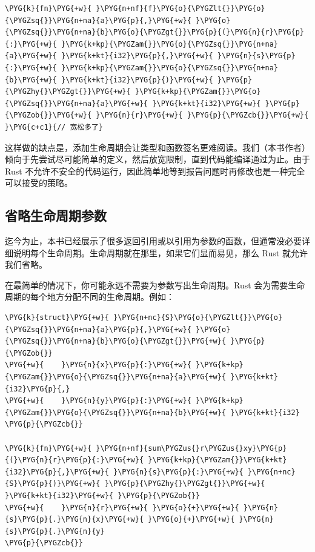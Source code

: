 \begin{Verbatim}[commandchars=\\\{\},breaklines=true,breakanywhere=true,fontsize=\codefont,xleftmargin=17bp]
\PYG{k}{fn}\PYG{+w}{ }\PYG{n+nf}{f}\PYG{o}{\PYGZlt{}}\PYG{o}{\PYGZsq{}}\PYG{n+na}{a}\PYG{p}{,}\PYG{+w}{ }\PYG{o}{\PYGZsq{}}\PYG{n+na}{b}\PYG{o}{\PYGZgt{}}\PYG{p}{(}\PYG{n}{r}\PYG{p}{:}\PYG{+w}{ }\PYG{k+kp}{\PYGZam{}}\PYG{o}{\PYGZsq{}}\PYG{n+na}{a}\PYG{+w}{ }\PYG{k+kt}{i32}\PYG{p}{,}\PYG{+w}{ }\PYG{n}{s}\PYG{p}{:}\PYG{+w}{ }\PYG{k+kp}{\PYGZam{}}\PYG{o}{\PYGZsq{}}\PYG{n+na}{b}\PYG{+w}{ }\PYG{k+kt}{i32}\PYG{p}{)}\PYG{+w}{ }\PYG{p}{\PYGZhy{}\PYGZgt{}}\PYG{+w}{ }\PYG{k+kp}{\PYGZam{}}\PYG{o}{\PYGZsq{}}\PYG{n+na}{a}\PYG{+w}{ }\PYG{k+kt}{i32}\PYG{+w}{ }\PYG{p}{\PYGZob{}}\PYG{+w}{ }\PYG{n}{r}\PYG{+w}{ }\PYG{p}{\PYGZcb{}}\PYG{+w}{ }\PYG{c+c1}{// 宽松多了}
\end{Verbatim}

这样做的缺点是，添加生命周期会让类型和函数签名更难阅读。我们（本书作者）倾向于先尝试尽可能简单的定义，然后放宽限制，直到代码能编译通过为止。由于 Rust 不允许不安全的代码运行，因此简单地等到报告问题时再修改也是一种完全可以接受的策略。

\subsection{省略生命周期参数}

迄今为止，本书已经展示了很多返回引用或以引用为参数的函数，但通常没必要详细说明每个生命周期。生命周期就在那里，如果它们显而易见，那么 Rust 就允许我们省略。

在最简单的情况下，你可能永远不需要为参数写出生命周期。Rust 会为需要生命周期的每个地方分配不同的生命周期。例如：

\begin{Verbatim}[commandchars=\\\{\},breaklines=true,breakanywhere=true,fontsize=\codefont,xleftmargin=17bp]
\PYG{k}{struct}\PYG{+w}{ }\PYG{n+nc}{S}\PYG{o}{\PYGZlt{}}\PYG{o}{\PYGZsq{}}\PYG{n+na}{a}\PYG{p}{,}\PYG{+w}{ }\PYG{o}{\PYGZsq{}}\PYG{n+na}{b}\PYG{o}{\PYGZgt{}}\PYG{+w}{ }\PYG{p}{\PYGZob{}}
\PYG{+w}{    }\PYG{n}{x}\PYG{p}{:}\PYG{+w}{ }\PYG{k+kp}{\PYGZam{}}\PYG{o}{\PYGZsq{}}\PYG{n+na}{a}\PYG{+w}{ }\PYG{k+kt}{i32}\PYG{p}{,}
\PYG{+w}{    }\PYG{n}{y}\PYG{p}{:}\PYG{+w}{ }\PYG{k+kp}{\PYGZam{}}\PYG{o}{\PYGZsq{}}\PYG{n+na}{b}\PYG{+w}{ }\PYG{k+kt}{i32}
\PYG{p}{\PYGZcb{}}

\PYG{k}{fn}\PYG{+w}{ }\PYG{n+nf}{sum\PYGZus{}r\PYGZus{}xy}\PYG{p}{(}\PYG{n}{r}\PYG{p}{:}\PYG{+w}{ }\PYG{k+kp}{\PYGZam{}}\PYG{k+kt}{i32}\PYG{p}{,}\PYG{+w}{ }\PYG{n}{s}\PYG{p}{:}\PYG{+w}{ }\PYG{n+nc}{S}\PYG{p}{)}\PYG{+w}{ }\PYG{p}{\PYGZhy{}\PYGZgt{}}\PYG{+w}{ }\PYG{k+kt}{i32}\PYG{+w}{ }\PYG{p}{\PYGZob{}}
\PYG{+w}{    }\PYG{n}{r}\PYG{+w}{ }\PYG{o}{+}\PYG{+w}{ }\PYG{n}{s}\PYG{p}{.}\PYG{n}{x}\PYG{+w}{ }\PYG{o}{+}\PYG{+w}{ }\PYG{n}{s}\PYG{p}{.}\PYG{n}{y}
\PYG{p}{\PYGZcb{}}
\end{Verbatim}

